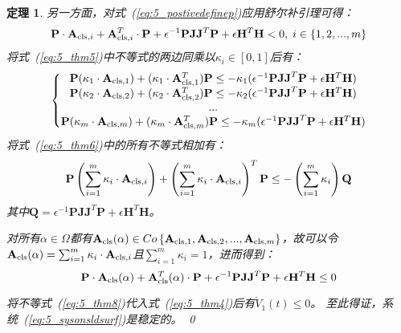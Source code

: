 \documentclass{article}
\newtheorem{theorem}{定理}
\begin{document}
\begin{theorem}
另一方面，对式~(\ref{eq:5_postivedefinep})应用舒尔补引理可得：
\begin{equation}
 \mathbf{P}\cdot \mathbf{A}_{{\rm{cls}},i}+\mathbf{A}_{{\rm{cls}},i}^{T}\cdot \mathbf{P}+ \epsilon^{-1}\mathbf{PJJ}^{T}\mathbf{P} + \epsilon \mathbf{H}^{T}\mathbf{H} < 0, \;i \in \{1,2,...,m\}
\label{eq:5_thm5}
\end{equation}
将式~(\ref{eq:5_thm5})中不等式的两边同乘以$\kappa_i\in[0,1]$后有：
\begin{equation}
\left \{
\begin{matrix}
 \mathbf{P}(\kappa_1\cdot \mathbf{A}_{{\rm{cls}},1})+(\kappa_1\cdot \mathbf{A}_{{\rm{cls}},1}^{T})  \mathbf{P} \leq -\kappa_1 ( \epsilon^{-1}\mathbf{PJJ}^{T}\mathbf{P} + \epsilon \mathbf{H}^{T}\mathbf{H})\\
 \mathbf{P}(\kappa_2\cdot \mathbf{A}_{{\rm{cls}},2})+(\kappa_2\cdot \mathbf{A}_{{\rm{cls}},2}^{T})  \mathbf{P} \leq -\kappa_2 ( \epsilon^{-1}\mathbf{PJJ}^{T}\mathbf{P} + \epsilon \mathbf{H}^{T}\mathbf{H})\\
...\\
 \mathbf{P}(\kappa_m\cdot \mathbf{A}_{{\rm{cls}},m})+(\kappa_m\cdot \mathbf{A}_{{\rm{cls}},m}^{T})  \mathbf{P} \leq -\kappa_m (\epsilon^{-1}\mathbf{PJJ}^{T}\mathbf{P} + \epsilon \mathbf{H}^{T}\mathbf{H})\\
\end{matrix}
\right .
\label{eq:5_thm6}
\end{equation}
将式~(\ref{eq:5_thm6})中的所有不等式相加有：
\begin{equation}
\mathbf{P}\left(  \sum_{i=1}^{m}\kappa_i\cdot \mathbf{A}_{{\rm{cls}},i} \right)+\left(  \sum_{i=1}^{m}\kappa_i\cdot \mathbf{A}_{{\rm{cls}},i} \right)^{T}\mathbf{P}\leq -\left(\sum_{i=1}^{m}\kappa_i \right)\mathbf{Q}
\label{eq:5_thm7}
\end{equation}
其中$\mathbf{Q} = \epsilon^{-1}\mathbf{PJJ}^{T}\mathbf{P} + \epsilon \mathbf{H}^{T}\mathbf{H}$。

对所有$\alpha\in\Omega$都有$\mathbf{A}_{\rm{cls}}(\alpha)\in Co\left\{\mathbf{A}_{{\rm{cls}},1},\mathbf{A}_{{\rm{cls}},2},...,\mathbf{A}_{{\rm{cls}},m}\right\}$，故可以令$\mathbf{A}_{\rm{cls}}(\alpha)=\sum_{i=1}^{m}\kappa_i\cdot \mathbf{A}_{{\rm{cls}},i}$且$\sum_{i=1}^{m}\kappa_i=1$，进而得到：
\begin{equation}
\mathbf{P}\cdot \mathbf{A}_{\rm{cls}}(\alpha)+\mathbf{A}_{\rm{cls}}^{T}(\alpha)\cdot \mathbf{P} + \epsilon^{-1}\mathbf{PJJ}^{T}\mathbf{P} + \epsilon \mathbf{H}^{T}\mathbf{H}\leq 0
\label{eq:5_thm8}
\end{equation}

将不等式~(\ref{eq:5_thm8})代入式~(\ref{eq:5_thm4})后有$\dot V_1(t) \leq 0$。
至此得证，系统~(\ref{eq:5_sysonsldsurf})是稳定的。
\qed
\end{theorem}
\end{document}
